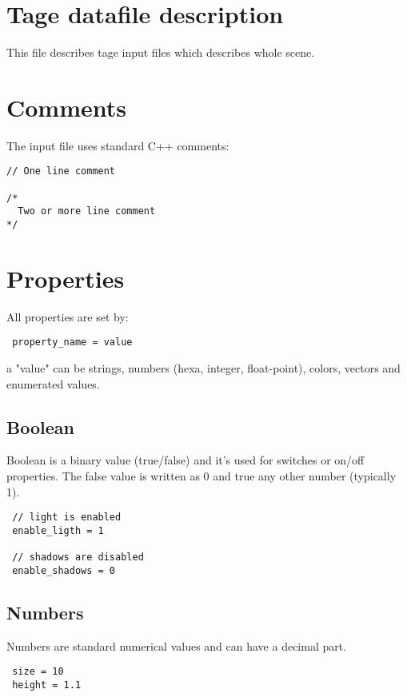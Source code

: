 \documentclass[11pt]{article}
\begin{document}
\section{Tage datafile description}

This file describes tage input files which describes whole scene.

\section{Comments}

The input file uses standard C++ comments:

\begin{verbatim}
// One line comment

/*
  Two or more line comment
*/
\end{verbatim}

\section{Properties}

All properties are set by:

\begin{verbatim}
 property_name = value
\end{verbatim}

a "value" can be strings, numbers (hexa, integer, float-point), colors, vectors
and enumerated values.

\subsection{Boolean}

Boolean is a binary value (true/false) and it's used for switches
or on/off properties. The false value is written as 0 and true any other
number (typically 1).

\begin{verbatim}
 // light is enabled 
 enable_ligth = 1
 
 // shadows are disabled
 enable_shadows = 0
\end{verbatim}

\subsection{Numbers}

Numbers are standard numerical values and can have a decimal part.

\begin{verbatim}
 size = 10
 height = 1.1
\end{verbatim}
\end{document}
